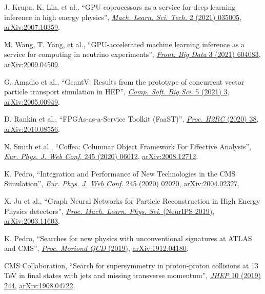 \begin{description}[leftmargin=12pt,font=\normalfont,labelsep=0em]
\item J. Krupa, K. Lin, et al., ``GPU coprocessors as a service for deep learning inference in high energy physics'', \href{https://doi.org/10.1088/2632-2153/abec21}{\emph{Mach. Learn. Sci. Tech.} 2 (2021) 035005}, \href{https://arxiv.org/abs/2007.10359}{arXiv:2007.10359}. %
\item M. Wang, T. Yang, et al., ``GPU-accelerated machine learning inference as a service for computing in neutrino experiments'', \href{https://doi.org/10.3389/fdata.2020.604083}{\emph{Front. Big Data} 3 (2021) 604083}, \href{https://arxiv.org/abs/2009.04509}{arXiv:2009.04509}. %
\item \begin{sloppypar}G. Amadio et al., ``GeantV: Results from the prototype of concurrent vector particle transport simulation in HEP'', \href{https://doi.org/10.1007/s41781-020-00048-6}{\emph{Comp. Soft. Big Sci.} 5 (2021) 3}, \href{https://arxiv.org/abs/2005.00949}{arXiv:2005.00949}.\end{sloppypar} %
\item D. Rankin et al., ``FPGAs-as-a-Service Toolkit (FaaST)'', \href{https://doi.ieeecomputersociety.org/10.1109/H2RC51942.2020.00010}{\emph{Proc. H2RC} (2020) 38}, \href{https://arxiv.org/abs/2010.08556}{arXiv:2010.08556}. %
\item N. Smith et al., ``Coffea: Columnar Object Framework For Effective Analysis'', \href{https://doi.org/10.1051/epjconf/202024506012}{\emph{Eur. Phys. J. Web Conf.} 245 (2020) 06012}, \href{https://arxiv.org/abs/2008.12712}{arXiv:2008.12712}. %
\item K. Pedro, ``Integration and Performance of New Technologies in the CMS Simulation'', \href{https://doi.org/10.1051/epjconf/202024502020}{\emph{Eur. Phys. J. Web Conf.} 245 (2020) 02020}, \href{https://arxiv.org/abs/2004.02327}{arXiv:2004.02327}. %
\item X. Ju et al., ``Graph Neural Networks for Particle Reconstruction in High Energy Physics detectors'', \href{https://ml4physicalsciences.github.io/2019/#papers}{\emph{Proc. Mach. Learn. Phys. Sci.} (NeurIPS 2019)}, \href{https://arxiv.org/abs/2003.11603}{arXiv:2003.11603}. %
\item K. Pedro, ``Searches for new physics with unconventional signatures at ATLAS and CMS'', \href{http://moriond.in2p3.fr/previous-sessions.html}{\emph{Proc. Moriond QCD} (2019)}, \href{https://arxiv.org/abs/1912.04180}{arXiv:1912.04180}. %
\item CMS Collaboration, ``Search for supersymmetry in proton-proton collisions at 13 TeV in final states with jets and missing transverse momentum'', \href{http://dx.doi.org/10.1007/JHEP10(2019)244}{\emph{JHEP} 10 (2019) 244}, \href{https://arxiv.org/abs/1908.04722}{arXiv:1908.04722}. %

\end{description}

